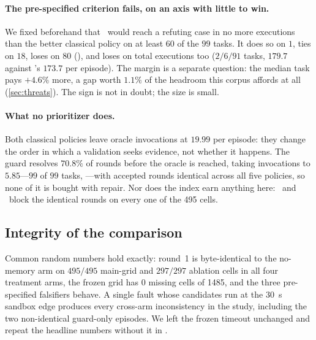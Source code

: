 \paragraph{The pre-specified criterion fails, on an axis with little to win.}
We fixed beforehand that \polguard\ would reach a refuting case in no more
executions than the better classical policy on at least $60$ of the $99$ tasks.
It does so on $1$, ties on $18$, loses on $80$ (), and loses on total
executions too ($2/6/91$ tasks, $179.7$ against \polven's $173.7$ per episode).
The margin is a separate question: the median task pays $+4.6\%$ more, a gap
worth $1.1\%$ of the headroom this corpus affords at all
(\cref{sec:threats}). The sign is not in doubt; the size is small.

\paragraph{What no prioritizer does.}
Both classical policies leave oracle invocations at $19.99$ per episode: they
change the order in which a validation seeks evidence, not whether it happens.
The guard resolves $70.8\%$ of rounds before the oracle is reached, taking
invocations to $5.85$---$99$ of $99$ tasks, ---with accepted
rounds identical across all five policies, so none of it is bought with repair.
Nor does the index earn anything here: \polguard\ and \poldedup\ block the
identical rounds on every one of the \num{495} cells.

\fullonly{}

\subsection{Integrity of the comparison}
\label{sec:results-integrity}

Common random numbers hold exactly: round~1 is byte-identical to the no-memory
arm on $495/495$ main-grid and $297/297$ ablation cells in all four treatment
arms, the frozen grid has $0$ missing cells of \num{1485}, and the three
pre-specified falsifiers behave. A single fault whose candidates run at the
\SI{30}{\second} sandbox edge produces every cross-arm inconsistency in the
study, including the two non-identical guard-only episodes. We left the frozen
timeout unchanged and repeat the headline numbers without it in
.

\ifsuppmatter\else\fi
